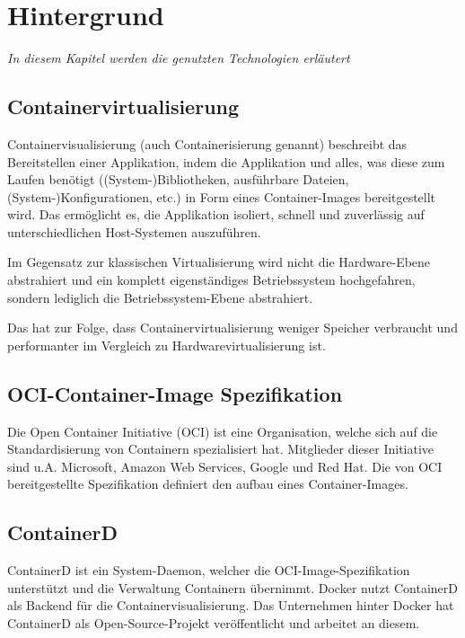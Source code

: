 \chapter{Hintergrund}

\label{cha:background}
\textit{In diesem Kapitel werden die genutzten Technologien erläutert}

\section{Containervirtualisierung}

Containervisualisierung (auch Containerisierung genannt) beschreibt das Bereitstellen einer Applikation, indem die Applikation und alles, was diese zum Laufen benötigt ((System-)Bibliotheken, ausführbare Dateien, (System-)Konfigurationen, etc.) in Form eines Container-Images bereitgestellt wird. Das ermöglicht es, die Applikation isoliert, schnell und zuverlässig auf unterschiedlichen Host-Systemen auszuführen.

Im Gegensatz zur klassischen Virtualisierung wird nicht die Hardware-Ebene abstrahiert und ein komplett eigenständiges Betriebssystem hochgefahren, sondern lediglich die Betriebssystem-Ebene abstrahiert.

Das hat zur Folge, dass Containervirtualisierung weniger Speicher verbraucht und performanter im Vergleich zu Hardwarevirtualisierung ist.

\section{OCI-Container-Image Spezifikation}

Die Open Container Initiative (OCI) ist eine Organisation, welche sich auf die Standardisierung von Containern spezialisiert hat. Mitglieder dieser Initiative sind u.A. Microsoft, Amazon Web Services, Google und Red Hat. Die von OCI bereitgestellte Spezifikation definiert den aufbau eines Container-Images.

\section{ContainerD}

ContainerD ist ein System-Daemon, welcher die OCI-Image-Spezifikation unterstützt und die Verwaltung Containern übernimmt. Docker nutzt ContainerD als Backend für die Containervisualisierung. Das Unternehmen hinter Docker hat ContainerD als Open-Source-Projekt veröffentlicht und arbeitet an diesem.

